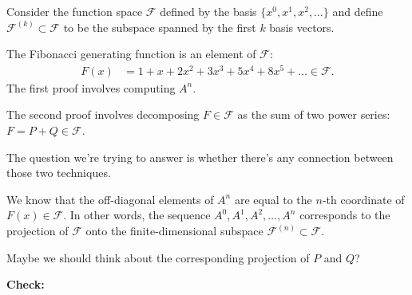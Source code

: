 \begin{lemma}
Consider the function space $\mathcal F$ defined by the basis $\{x^0, x^1, x^2, \ldots\}$ and
define $\mathcal F^{(k)} \subset \mathcal F$ to be the subspace spanned by the first $k$ basis
vectors.

The Fibonacci generating function is an element of $\mathcal F$:
\begin{align*}
    F(x) &= 1 + x + 2x^2 + 3x^3 + 5x^4 + 8x^5 + \ldots \in \mathcal F.
  \end{align*}
The first proof involves computing $A^n$.

The second proof involves decomposing $F \in \mathcal F$ as the sum of two power
series: $F = P + Q \in \mathcal F$.

The question we're trying to answer is whether there's any connection between those two techniques.

We know that the off-diagonal elements of $A^n$ are equal to the $n$-th coordinate
of $F(x) \in \mathcal F$. In other words, the sequence $A^0, A^1, A^2, \ldots, A^n$ corresponds to the
projection of $\mathcal F$ onto the finite-dimensional
subspace $\mathcal F^{(n)} \subset \mathcal F$.

Maybe we should think about the corresponding projection of $P$ and $Q$?



{\bf Check:}


\end{lemma}
